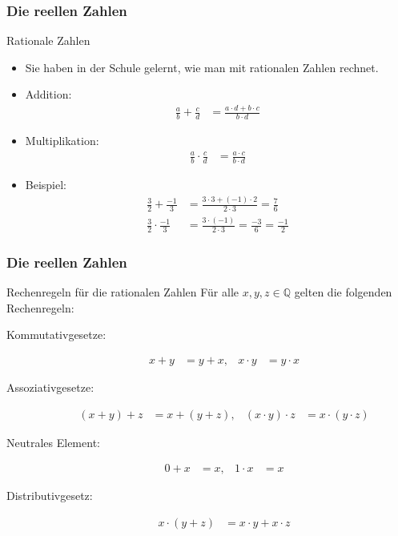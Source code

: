 \documentclass{beamer}
\newcommand\QQ{\mathbb Q}
\newcommand{\ue}{\"u}
\newcommand{\mytitle}{Die reellen Zahlen}
\begin{document}
\begin{frame}\frametitle{\mytitle}
	\begin{block}{Rationale Zahlen}
	\begin{itemize}
		\item Sie haben in der Schule gelernt, wie man mit rationalen Zahlen rechnet.
		\item \alert{Addition:}
			\begin{align*}
				\frac{a}{b}+\frac{c}{d}&=\frac{a\cdot d+b\cdot c}{b\cdot d}
			\end{align*}
		\item \alert{Multiplikation:}
			\begin{align*}
				\frac{a}{b}\cdot\frac{c}{d}&=\frac{a\cdot c}{b\cdot d}
			\end{align*}
		\item \alert{Beispiel:}
			\begin{align*}
				\frac{3}{2}+\frac{-1}{3}&=\frac{3\cdot 3+(-1)\cdot 2}{2\cdot 3}=\frac{7}{6}\\
				\frac{3}{2}\cdot\frac{-1}{3}&=\frac{3\cdot(-1)}{2\cdot 3}=\frac{-3}{6}=\frac{-1}{2}
			\end{align*}
	\end{itemize}
	\end{block}
\end{frame}

\begin{frame}\frametitle{\mytitle}
	\begin{block}{Rechenregeln f\ue r die rationalen Zahlen}
		F\ue r alle $x,y,z\in\QQ$ gelten die folgenden Rechenregeln:
		\begin{description}
			\item[Kommutativgesetze:] 
					\begin{align*}
						x+y&=y+x,&x\cdot y&=y\cdot x
			\end{align*}
			\item[Assoziativgesetze:]	
				\begin{align*}
					(x+y)+z&=x+(y+z),&(x\cdot y)\cdot z&=x\cdot(y\cdot z)
				\end{align*}
			\item[Neutrales Element:]
				\begin{align*}
					0+x&=x,&1\cdot x&=x
				\end{align*}
			\item[Distributivgesetz:]
				\begin{align*}
					x\cdot(y+z)&=x\cdot y+x\cdot z
				\end{align*}
		\end{description}
	\end{block}
\end{frame}
\end{document}

